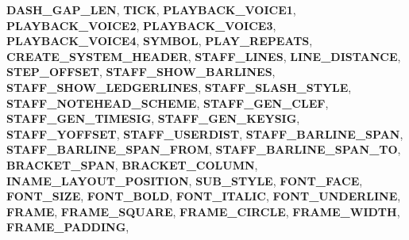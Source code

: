 \begin{DoxyCompactItemize}
{\bfseries D\+A\+S\+H\+\_\+\+G\+A\+P\+\_\+\+L\+EN}, 
{\bfseries T\+I\+CK}, 
\newline
{\bfseries P\+L\+A\+Y\+B\+A\+C\+K\+\_\+\+V\+O\+I\+C\+E1}, 
{\bfseries P\+L\+A\+Y\+B\+A\+C\+K\+\_\+\+V\+O\+I\+C\+E2}, 
{\bfseries P\+L\+A\+Y\+B\+A\+C\+K\+\_\+\+V\+O\+I\+C\+E3}, 
{\bfseries P\+L\+A\+Y\+B\+A\+C\+K\+\_\+\+V\+O\+I\+C\+E4}, 
\newline
{\bfseries S\+Y\+M\+B\+OL}, 
{\bfseries P\+L\+A\+Y\+\_\+\+R\+E\+P\+E\+A\+TS}, 
{\bfseries C\+R\+E\+A\+T\+E\+\_\+\+S\+Y\+S\+T\+E\+M\+\_\+\+H\+E\+A\+D\+ER}, 
{\bfseries S\+T\+A\+F\+F\+\_\+\+L\+I\+N\+ES}, 
\newline
{\bfseries L\+I\+N\+E\+\_\+\+D\+I\+S\+T\+A\+N\+CE}, 
{\bfseries S\+T\+E\+P\+\_\+\+O\+F\+F\+S\+ET}, 
{\bfseries S\+T\+A\+F\+F\+\_\+\+S\+H\+O\+W\+\_\+\+B\+A\+R\+L\+I\+N\+ES}, 
{\bfseries S\+T\+A\+F\+F\+\_\+\+S\+H\+O\+W\+\_\+\+L\+E\+D\+G\+E\+R\+L\+I\+N\+ES}, 
\newline
{\bfseries S\+T\+A\+F\+F\+\_\+\+S\+L\+A\+S\+H\+\_\+\+S\+T\+Y\+LE}, 
{\bfseries S\+T\+A\+F\+F\+\_\+\+N\+O\+T\+E\+H\+E\+A\+D\+\_\+\+S\+C\+H\+E\+ME}, 
{\bfseries S\+T\+A\+F\+F\+\_\+\+G\+E\+N\+\_\+\+C\+L\+EF}, 
{\bfseries S\+T\+A\+F\+F\+\_\+\+G\+E\+N\+\_\+\+T\+I\+M\+E\+S\+IG}, 
\newline
{\bfseries S\+T\+A\+F\+F\+\_\+\+G\+E\+N\+\_\+\+K\+E\+Y\+S\+IG}, 
{\bfseries S\+T\+A\+F\+F\+\_\+\+Y\+O\+F\+F\+S\+ET}, 
{\bfseries S\+T\+A\+F\+F\+\_\+\+U\+S\+E\+R\+D\+I\+ST}, 
{\bfseries S\+T\+A\+F\+F\+\_\+\+B\+A\+R\+L\+I\+N\+E\+\_\+\+S\+P\+AN}, 
\newline
{\bfseries S\+T\+A\+F\+F\+\_\+\+B\+A\+R\+L\+I\+N\+E\+\_\+\+S\+P\+A\+N\+\_\+\+F\+R\+OM}, 
{\bfseries S\+T\+A\+F\+F\+\_\+\+B\+A\+R\+L\+I\+N\+E\+\_\+\+S\+P\+A\+N\+\_\+\+TO}, 
{\bfseries B\+R\+A\+C\+K\+E\+T\+\_\+\+S\+P\+AN}, 
{\bfseries B\+R\+A\+C\+K\+E\+T\+\_\+\+C\+O\+L\+U\+MN}, 
\newline
{\bfseries I\+N\+A\+M\+E\+\_\+\+L\+A\+Y\+O\+U\+T\+\_\+\+P\+O\+S\+I\+T\+I\+ON}, 
{\bfseries S\+U\+B\+\_\+\+S\+T\+Y\+LE}, 
{\bfseries F\+O\+N\+T\+\_\+\+F\+A\+CE}, 
{\bfseries F\+O\+N\+T\+\_\+\+S\+I\+ZE}, 
\newline
{\bfseries F\+O\+N\+T\+\_\+\+B\+O\+LD}, 
{\bfseries F\+O\+N\+T\+\_\+\+I\+T\+A\+L\+IC}, 
{\bfseries F\+O\+N\+T\+\_\+\+U\+N\+D\+E\+R\+L\+I\+NE}, 
{\bfseries F\+R\+A\+ME}, 
\newline
{\bfseries F\+R\+A\+M\+E\+\_\+\+S\+Q\+U\+A\+RE}, 
{\bfseries F\+R\+A\+M\+E\+\_\+\+C\+I\+R\+C\+LE}, 
{\bfseries F\+R\+A\+M\+E\+\_\+\+W\+I\+D\+TH}, 
{\bfseries F\+R\+A\+M\+E\+\_\+\+P\+A\+D\+D\+I\+NG}, 
\newline

\end{DoxyCompactItemize}
